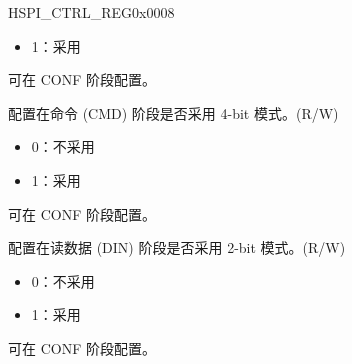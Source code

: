\begin{register}{H}{SPI\_CTRL\_REG}{0x0008}
\begin{regdesc}
\begin{reglist}
\begin{itemize}
    \item 1：采用
\end{itemize}
可在 CONF 阶段配置。
\label{fielddesc:SPIFCMDQUAD}\item [SPI\_FCMD\_QUAD] 配置在命令 (CMD) 阶段是否采用 4-bit 模式。(R/W)\\
\begin{itemize}
    \item 0：不采用
    \item 1：采用
\end{itemize}
可在 CONF 阶段配置。
\label{fielddesc:SPIFREADDUAL}\item [SPI\_FREAD\_DUAL] 配置在读数据 (DIN) 阶段是否采用 2-bit 模式。(R/W)\\
\begin{itemize}
    \item 0：不采用
    \item 1：采用
\end{itemize}
可在 CONF 阶段配置。

\item [见下页]
\end{reglist}\end{regdesc}
\end{register}


